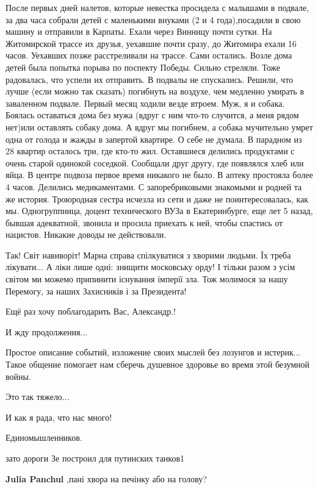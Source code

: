 \begin{itemize}
После первых дней налетов, которые невестка просидела с малышами в подвале, за
два часа собрали детей с маленькими внуками (2 и 4 года),посадили в свою
машину и отправили в Карпаты. Ехали через Винницу почти сутки. На Житомирской
трассе их друзья, уехавшие почти сразу, до Житомира ехали 16 часов. Уехавших позже
расстреливали на трассе. Сами остались. Возле дома детей была попытка порыва по
поспекту Победы. Сильно стреляли. Тоже радовалась, что успели их отправить. В
подвалы не спускались. Решили, что лучше (если можно так сказать) погибнуть на
воздухе, чем медленно умирать в заваленном подвале. Первый месяц ходили везде
втроем. Муж, я и собака. Боялась оставаться дома без мужа (вдруг с ним что-то
случится, а меня рядом нет)или оставлять собаку дома. А вдруг мы погибнем, а
собака мучительно умрет одна от голода и жажды в запертой квартире. О себе не
думала. В парадном из 28 квартир осталось три, где кто-то жил. Оставшиеся
делились продуктами с очень старой одинокой соседкой. Сообщали друг другу, где
появлялся хлеб или яйца. В центре подвоза первое время никакого не было. В аптеку
простояла более 4 часов. Делились медикаментами. С запоребриковыми знакомыми и
родней та же история. Троюродная сестра исчезла из сети и даже не
поинтересовалась, как мы. Одногруппница, доцент технического ВУЗа в
Екатеринбурге, еще лет 5 назад, бывшая адекватной, звонила и просила приехать к
ней, чтобы спастись от нацистов. Никакие доводы не действовали.


Так! Світ навиворіт! Марна справа спілкуватися з хворими людьми. Їх треба
лікувати... А ліки лише одні: знищити московську орду! І тільки разом з усім
світом ми можемо припинити існування імперії зла. Тож молимося за нашу
Перемогу, за наших Захисників і за Президента!


Ещё раз хочу поблагодарить Вас, Александр.!

И жду продолжения...

Простое описание событий, изложение своих мыслей без лозунгов и истерик...
Такое общение помогает нам сберечь душевное здоровье во время этой безумной
войны.

Это так тяжело...

И как я рада, что нас много!

Единомышленников.

зато дороги Зе построил для путинских танков1

\begin{itemize} %
\textbf{Julia Panchul} ,пані хвора на печінку або на голову?


\end{itemize}
\end{itemize}
